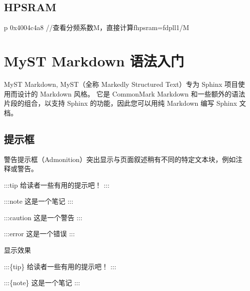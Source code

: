 \documentclass[letterpaper,10pt,english]{sphinxmanual}
\begin{document}
\section{HPSRAM}
\label{\detokenize{r128_u9a8c_u8bc1_u56fa_u4ef6/r128_u9a8c_u8bc1_u56fa_u4ef6_u5f00_u53d1_u6307_u5357:hpsram}}
\sphinxAtStartPar
{}

\begin{sphinxVerbatim}[commandchars=\\\{\}]
p 0x4004c4a8 //查看分频系数M，直接计算f\PYGZus{}hpsram=f\PYGZus{}dpll1/M
\end{sphinxVerbatim}

\sphinxstepscope


\chapter{MyST Markdown 语法入门}
\label{\detokenize{other/myst_markdown:myst-markdown}}\label{\detokenize{other/myst_markdown::doc}}
\sphinxAtStartPar
MyST Markdown, MyST（全称 Markedly Structured Text）专为 Sphinx 项目使用而设计的 Markdown 风格。 它是 CommonMark Markdown 和一些额外的语法片段的组合，以支持 Sphinx 的功能，因此您可以用纯 Markdown 编写 Sphinx 文档。

\sphinxAtStartPar
{}


\section{提示框}
\label{\detokenize{other/myst_markdown:id1}}
\sphinxAtStartPar
警告提示框（Admonition）突出显示与页面叙述稍有不同的特定文本块，例如注释或警告。

\begin{sphinxVerbatim}[commandchars=\\\{\}]
:::\PYGZob{}tip\PYGZcb{}
给读者一些有用的提示吧！
:::

:::\PYGZob{}note\PYGZcb{}
这是一个笔记
:::


:::\PYGZob{}caution\PYGZcb{}
这是一个警告
:::

:::\PYGZob{}error\PYGZcb{}
这是一个错误
:::
\end{sphinxVerbatim}

\sphinxAtStartPar
显示效果

\sphinxAtStartPar
:::\{tip\}
给读者一些有用的提示吧！
:::

\sphinxAtStartPar
:::\{note\}
这是一个笔记
:::
\end{document}
